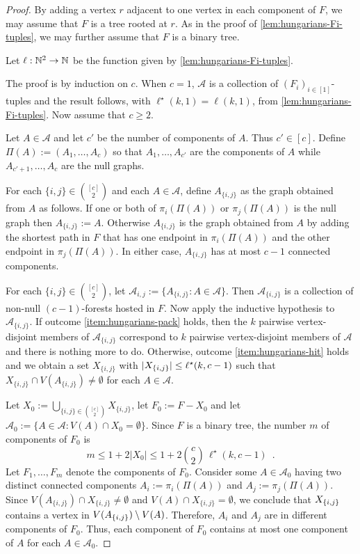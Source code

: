 \documentclass{patmorin}
\newcommand{\pat}[1]{\textcolor{Blue}{[Pat: #1]}}
\newcommand{\piotr}[1]{\textcolor{red}{Piotr: #1}}
\DeclarePairedDelimiter\set{\{}{\}}
\renewcommand{\mid}{:}  %
\begin{document}
\hungarians*
\begin{proof}
  By adding a vertex $r$ adjacent to one vertex in each component of $F$, we may assume that $F$ is a tree rooted at $r$.  As in the proof of \cref{lem:hungarians-Fi-tuples}, we may further assume that $F$ is a binary tree.

  Let $\ell:\mathbb{N}^2\to\mathbb{N}$ be the function given by \cref{lem:hungarians-Fi-tuples}.

  The proof is by induction on $c$.  When $c=1$, $\mathcal{A}$ is a collection of $(F_i)_{i\in[1]}$-tuples and the result follows, with $\ell^\star(k,1)=\ell(k,1)$, from \cref{lem:hungarians-Fi-tuples}.  Now assume that $c\ge 2$.

  Let $A\in\mathcal{A}$ and let $c'$ be the number of components of $A$. Thus $c'\in[c]$. 
  Define $\Pi(A):=(A_1,\ldots,A_c)$ so that $A_1,\ldots,A_{c'}$ are the components of $A$ while $A_{c'+1},\ldots,A_c$ are the null graphs.
  
  For each $\{i,j\}\in\binom{[c]}{2}$ and each $A\in\mathcal{A}$, define $A_{\{i,j\}}$ as the graph obtained from $A$ as follows.  If one or both of $\pi_i(\Pi(A))$ or $\pi_j(\Pi(A))$ is the null graph then $A_{\{i,j\}}:=A$. Otherwise $A_{\{i,j\}}$ is the graph obtained from $A$ by adding the shortest path in $F$ that has one endpoint in $\pi_i(\Pi(A))$ and the other endpoint in $\pi_j(\Pi(A))$.  In either case, $A_{\{i,j\}}$ has at most $c-1$ connected components.

  For each $\{i,j\}\in\binom{[c]}{2}$, let $\mathcal{A}_{i,j}:=\{A_{\{i,j\}}\mid A\in \mathcal{A}\}$.  Then $\mathcal{A}_{\{i,j\}}$ is a collection of non-null $(c-1)$-forests hosted in $F$.  Now apply the inductive hypothesis to $\mathcal{A}_{\{i,j\}}$.  If outcome \cref{item:hungarians-pack} holds, then the $k$ pairwise vertex-disjoint members of $\mathcal{A}_{\{i,j\}}$ correspond to $k$ pairwise vertex-disjoint members of $\mathcal{A}$ and there is nothing more to do. Otherwise, outcome \cref{item:hungarians-hit} holds and we obtain a set $X_{\{i,j\}}$ with $|X_{\set{i,j}}|\leq \ell^\star(k,c-1)$ such that $X_{\{i,j\}}\cap V(A_{\{i,j\}})\neq\emptyset$ for each $A\in\mathcal{A}$.

  
  Let $X_0:=\bigcup_{\{i,j\}\in\binom{[c]}{2}} X_{\{i,j\}}$, let $F_0:=F-X_0$ and let $\mathcal{A}_0:=\{A\in\mathcal{A}\mid V(A)\cap X_0=\emptyset\}$.  Since $F$ is a binary tree, the number $m$ of components of $F_0$ is 
  \begin{equation}
    \textstyle m \leq 1+2|X_0|\le 1+2\binom{c}{2}\,\ell^\star(k,c-1) \enspace .
  \end{equation}
  Let $F_1,\ldots,F_m$ denote the components of $F_0$.
  Consider some $A\in\mathcal{A}_0$ having two distinct connected components $A_i:=\pi_i(\Pi(A))$ and $A_j:=\pi_j(\Pi(A))$.  Since $V(A_{\{i,j\}})\cap X_{\{i,j\}}\neq\emptyset$ and $V(A)\cap X_{\{i,j\}}=\emptyset$, 
  we conclude that $X_{\set{i,j}}$ contains a vertex in $V(A_{\set{i,j}})\setminus V(A)$. 
  Therefore, $A_i$ and $A_j$ are in different components of $F_0$.  Thus, each component of $F_0$ contains at most one component of $A$ for each $A\in\mathcal{A}_0$. 
  

\end{proof}
\end{document}
